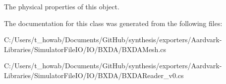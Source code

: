 The physical properties of this object. 



The documentation for this class was generated from the following files\+:\begin{DoxyCompactItemize}
\item 
C\+:/\+Users/t\+\_\+howab/\+Documents/\+Git\+Hub/synthesis/exporters/\+Aardvark-\/\+Libraries/\+Simulator\+File\+I\+O/\+I\+O/\+B\+X\+D\+A/B\+X\+D\+A\+Mesh.\+cs\item 
C\+:/\+Users/t\+\_\+howab/\+Documents/\+Git\+Hub/synthesis/exporters/\+Aardvark-\/\+Libraries/\+Simulator\+File\+I\+O/\+I\+O/\+B\+X\+D\+A/B\+X\+D\+A\+Reader\+\_\+v0.\+cs\end{DoxyCompactItemize}
